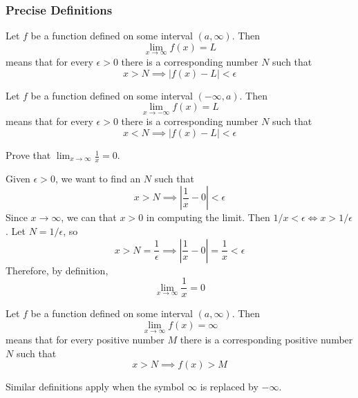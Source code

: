 \subsubsection*{Precise Definitions}
\begin{definition}
    Let \(f\) be a function defined on some interval \((a,\infty)\).
    Then
    \[\lim_{x\to\infty}f(x)=L\]
    means that for every \(\epsilon>0\) there is a corresponding number \(N\)
    such that
    \[x>N\implies|f(x)-L|<\epsilon\]
\end{definition}
\begin{definition}
    Let \(f\) be a function defined on some interval \((-\infty,a)\).
    Then
    \[\lim_{x\to-\infty}f(x)=L\]
    means that for every \(\epsilon>0\) there is a corresponding number \(N\)
    such that
    \[x<N\implies|f(x)-L|<\epsilon\]
\end{definition}
\begin{problem}
    Prove that \(\displaystyle{\lim_{x\to \infty}\frac{1}{x}=0}\).
\end{problem}
\begin{solution}
    Given \(\epsilon>0\), we want to find an \(N\) such that
    \[x>N\implies\left|\frac{1}{x}-0\right|<\epsilon\]
    Since \(x\to \infty\),
    we can that \(x>0\) in computing the limit.
    Then \(1/x<\epsilon\iff x>1/\epsilon\).
    Let \(N=1/\epsilon\),
    so
    \[x>N=\frac{1}{\epsilon}\implies\left|\frac{1}{x}-0\right|=\frac{1}{x}
    <\epsilon\]
    Therefore, by definition,
    \[\lim_{x\to \infty}\frac{1}{x}=0\]
\end{solution}
\begin{definition}
    Let \(f\) be a function defined on some interval \((a,\infty)\).
    Then
    \[\lim_{x\to\infty}f(x)=\infty\]
    means that for every positive number \(M\) there is a corresponding
    positive number \(N\) such that
    \[x>N\implies f(x)>M\]
\end{definition}
Similar definitions apply when the symbol \(\infty\) is replaced by \(-\infty\).